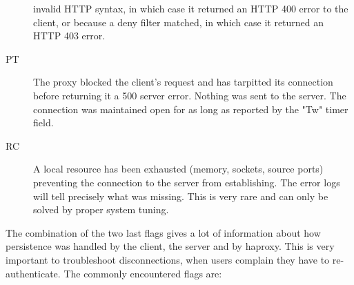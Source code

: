 \begin{description}
          invalid HTTP syntax, in which case it returned an HTTP 400 error to
          the client, or because a deny filter matched, in which case it
          returned an HTTP 403 error.
     \item[PT]
          The proxy blocked the client's request and has tarpitted its
          connection before returning it a 500 server error. Nothing was sent
          to the server. The connection was maintained open for as long as
          reported by the "Tw" timer field.
     \item[RC]
          A local resource has been exhausted (memory, sockets, source ports)
          preventing the connection to the server from establishing. The error
          logs will tell precisely what was missing. This is very rare and can
          only be solved by proper system tuning.
\end{description}

The combination of the two last flags gives a lot of information about how
persistence was handled by the client, the server and by haproxy. This is very
important to troubleshoot disconnections, when users complain they have to
re-authenticate. The commonly encountered flags are:

